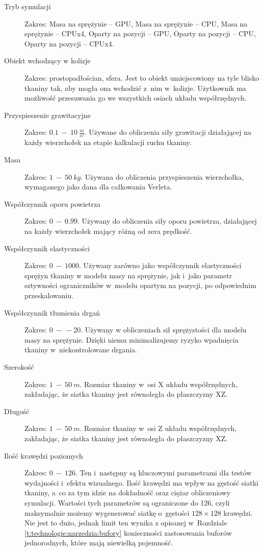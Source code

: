 		\begin{description}
			
			\item[Tryb symulacji] Zakres: Masa na sprężynie -- GPU, Masa na sprężynie -- CPU, Masa na sprężynie -- CPUx4, Oparty na pozycji -- GPU, Oparty na pozycji -- CPU, Oparty na pozycji -- CPUx4.
			
			\item[Obiekt wchodzący w kolizje] Zakres: prostopadłościan, sfera. Jest to obiekt umiejscowiony na tyle blisko tkaniny tak, aby mogła ona wchodzić z~nim w~kolizje. Użytkownik ma możliwość przesuwania go we wszystkich osiach układu współrzędnych.
			
			\item[Przyspieszenie grawitacyjne] Zakres: \(0.1\ -\ 10\ \frac{m}{s^{2}} \). Używane do obliczenia siły grawitacji działającej na każdy wierzchołek na etapie kalkulacji ruchu tkaniny.
			
			\item[Masa] Zakres: \(1\ -\ 50\ kg\). Używana do obliczenia przyspieszenia wierzchołka, wymaganego jako dana dla całkowania Verleta.
			
			\item[Współczynnik oporu powietrza] Zakres: \(0\ -\ 0.99\). Używany do obliczenia siły oporu powietrza, działającej na każdy wierzchołek mający różną od zera prędkość.
			
			\item[Współczynnik elastyczności] Zakres: \(0\ -\ 1000\). Używany zarówno jako współczynnik elastyczności sprężyn tkaniny w modelu masy na sprężynie, jak i~jako parametr sztywności ograniczników w~modelu opartym na pozycji, po odpowiednim przeskalowaniu.
			
			\item[Współczynnik tłumienia drgań] Zakres: \(0\ -\ -20\). Używany w obliczeniach sił sprężystości dla modelu masy na sprężynie. Dzięki niemu minimalizujemy ryzyko wpadnięcia tkaniny w~niekontrolowane drgania.
			
			\item[Szerokość] Zakres: \(1\ -\ 50\ m\). Rozmiar tkaniny w~osi X układu współrzędnych, zakładając, że siatka tkaniny jest równoległa do płaszczyzny XZ.
			
			\item[Długość]Zakres: \(1\ -\ 50\ m\). Rozmiar tkaniny w~osi Z układu współrzędnych, zakładając, że siatka tkaniny jest równoległa do płaszczyzny XZ.
			
			\item[Ilość krawędzi poziomych] Zakres: \(0\ -\ 126\). Ten i~następny są kluczowymi parametrami dla testów wydajności i~efektu wizualnego. Ilość krawędzi ma wpływ na gęstość siatki tkaniny, a~co za tym idzie na dokładność oraz ciężar obliczeniowy symulacji. Wartości tych parametrów są ograniczone do 126, czyli maksymalnie możemy wygenerować siatkę o~gęstości \( 128 \times 128 \) krawędzi. Nie jest to dużo, jednak limit ten wynika z opisanej w~Rozdziale \ref{t:technologie:narzedzia:bufory} konieczności zastosowania buforów jednorodnych, które mają niewielką pojemność.
			

\end{description}
